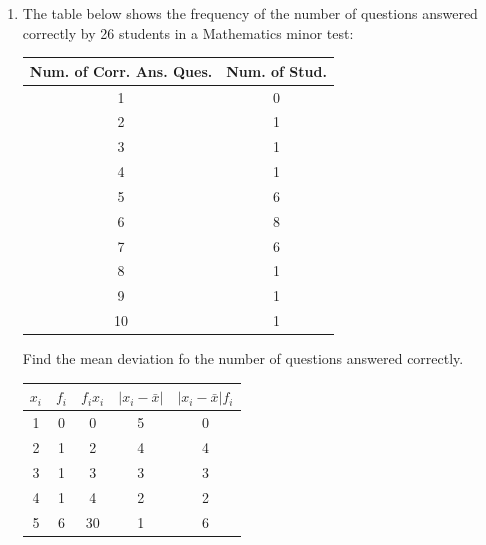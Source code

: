 \documentclass{report}
\begin{document}
\begin{multicols}{2}
\begin{enumerate}
    \item The table below shows the frequency of the number of questions answered
          correctly by 26 students in a Mathematics minor test:
          \begin{center}
            \begin{tabular}{|c|c|}
              \hline
              Num. of Corr. Ans. Ques. & Num. of Stud. \\
              \hline
              1                        & 0             \\
              2                        & 1             \\
              3                        & 1             \\
              4                        & 1             \\
              5                        & 6             \\
              6                        & 8             \\
              7                        & 6             \\
              8                        & 1             \\
              9                        & 1             \\
              10                       & 1             \\
              \hline
            \end{tabular}
          \end{center}
          Find the mean deviation fo the number of questions answered correctly.
          \sol{}
          \begin{center}
            \begin{tabular}{|c|c|c|c|c|}
              \hline
              $x_i$ & $f_i$ & $f_ix_i$ & $|x_i - \bar{x}|$ & $|x_i - \bar{x}|f_i$ \\
              \hline
              1     & 0     & 0        & 5                 & 0                    \\
              2     & 1     & 2        & 4                 & 4                    \\
              3     & 1     & 3        & 3                 & 3                    \\
              4     & 1     & 4        & 2                 & 2                    \\
              5     & 6     & 30       & 1                 & 6                    \\

\end{tabular}
\end{center}
\end{enumerate}
\end{multicols}
\end{document}
